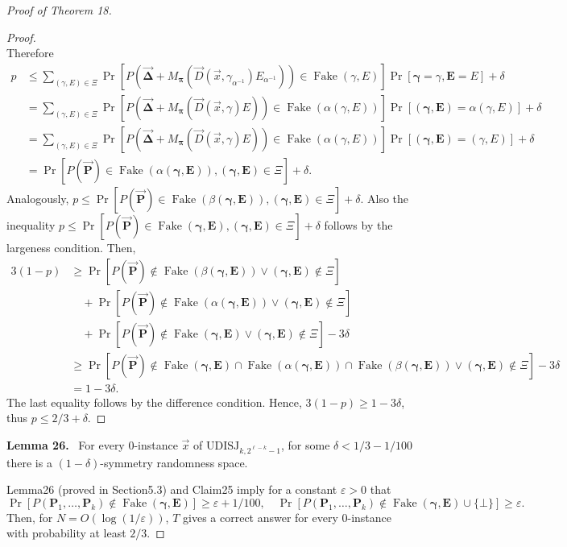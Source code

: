 \documentclass[10pt,a4paper]{article}
\newenvironment{authorclaim}[1]{\par\medskip\noindent\textbf{#1.}\ \ignorespaces}{\par\medskip}
\begin{document}
\begin{proof}[Proof of Theorem 18]
\begin{proof}
\[\]
Therefore
\begin{align*}
p&\le\sum_{(\gamma,E)\in\Xi}\Pr[P(\boldsymbol{\vec\Delta}+M_{\boldsymbol\pi}(\vec D(\vec x,\gamma_{\alpha^{-1}})E_{\alpha^{-1}}))\in\operatorname{Fake}(\gamma,E)]\Pr[\boldsymbol\gamma=\gamma,\mathbf E=E]+\delta\\
&=\sum_{(\gamma,E)\in\Xi}\Pr[P(\boldsymbol{\vec\Delta}+M_{\boldsymbol\pi}(\vec D(\vec x,\gamma)E))\in\operatorname{Fake}(\alpha(\gamma,E))]\Pr[(\boldsymbol\gamma,\mathbf E)=\alpha(\gamma,E)]+\delta\\
&=\sum_{(\gamma,E)\in\Xi}\Pr[P(\boldsymbol{\vec\Delta}+M_{\boldsymbol\pi}(\vec D(\vec x,\gamma)E))\in\operatorname{Fake}(\alpha(\gamma,E))]\Pr[(\boldsymbol\gamma,\mathbf E)=(\gamma,E)]+\delta\\
&=\Pr[P(\boldsymbol{\vec P})\in\operatorname{Fake}(\alpha(\boldsymbol\gamma,\mathbf E)),(\boldsymbol\gamma,\mathbf E)\in\Xi]+\delta .
\end{align*}
Analogously, $p\le\Pr[P(\boldsymbol{\vec P})\in\operatorname{Fake}(\beta(\boldsymbol\gamma,\mathbf E)),(\boldsymbol\gamma,\mathbf E)\in\Xi]+\delta$. Also the inequality $p\le\Pr[P(\boldsymbol{\vec P})\in\operatorname{Fake}(\boldsymbol\gamma,\mathbf E),(\boldsymbol\gamma,\mathbf E)\in\Xi]+\delta$ follows by the largeness condition. Then,
\begin{align*}
3(1-p)&\ge\Pr[P(\boldsymbol{\vec P})\notin\operatorname{Fake}(\beta(\boldsymbol\gamma,\mathbf E))\vee(\boldsymbol\gamma,\mathbf E)\notin\Xi]\\
&\quad+\Pr[P(\boldsymbol{\vec P})\notin\operatorname{Fake}(\alpha(\boldsymbol\gamma,\mathbf E))\vee(\boldsymbol\gamma,\mathbf E)\notin\Xi]\\
&\quad+\Pr[P(\boldsymbol{\vec P})\notin\operatorname{Fake}(\boldsymbol\gamma,\mathbf E)\vee(\boldsymbol\gamma,\mathbf E)\notin\Xi]-3\delta\\
&\ge\Pr[P(\boldsymbol{\vec P})\notin\operatorname{Fake}(\boldsymbol\gamma,\mathbf E)\cap\operatorname{Fake}(\alpha(\boldsymbol\gamma,\mathbf E))\cap\operatorname{Fake}(\beta(\boldsymbol\gamma,\mathbf E))\vee(\boldsymbol\gamma,\mathbf E)\notin\Xi]-3\delta\\
&=1-3\delta .
\end{align*}
The last equality follows by the difference condition. Hence, $3(1-p)\ge1-3\delta$, thus $p\le2/3+\delta$.
\end{proof}
\begin{authorclaim}{Lemma 26}
For every 0-instance $\vec x$ of $\mathrm{UDISJ}_{k,2^{\ell-k}-1}$, for some $\delta<1/3-1/100$ there is a $(1-\delta)$-symmetry randomness space.
\end{authorclaim}
Lemma26 (proved in Section5.3) and Claim25 imply for a constant $\varepsilon>0$ that
\[
\Pr[P(\mathbf P_1,\ldots,\mathbf P_k)\notin\operatorname{Fake}(\boldsymbol\gamma,\mathbf E)]\ge\varepsilon+1/100,
\quad
\Pr[P(\mathbf P_1,\ldots,\mathbf P_k)\notin\operatorname{Fake}(\boldsymbol\gamma,\mathbf E)\cup\{\bot\}]\ge\varepsilon .
\]
Then, for $N=O(\log(1/\varepsilon))$, $T$ gives a correct answer for every 0-instance with probability at least $2/3$.
\end{proof}
\end{document}
